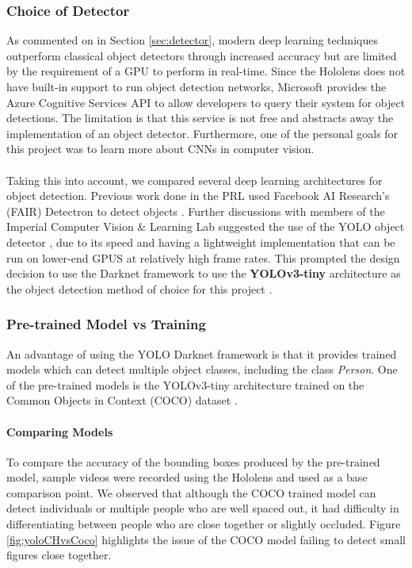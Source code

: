 \subsubsection{Choice of Detector}
As commented on in Section \ref{sec:detector}, modern deep learning techniques outperform classical object detectors through increased accuracy but are limited by the requirement of a GPU to perform in real-time. Since the Hololens does not have built-in support to run object detection networks, Microsoft provides the Azure Cognitive Services API to allow developers to query their system for object detections. The limitation is that this service is not free and abstracts away the implementation of an object detector. Furthermore, one of the personal goals for this project was to learn more about CNNs in computer vision.

\paragraph{} Taking this into account, we compared several deep learning architectures for object detection. Previous work done in the PRL used Facebook AI Research's (FAIR) Detectron to detect objects \cite{Chacon-Quesada, Detectron2018, Rena}. Further discussions with members of the Imperial Computer Vision \& Learning Lab suggested the use of the YOLO object detector \cite{Redmon}, due to its speed and having a lightweight implementation that can be run on lower-end GPUS at relatively high frame rates. This prompted the design decision to use the Darknet framework to use the \textbf{YOLOv3-tiny} architecture as the object detection method of choice for this project \cite{Redmon2018}.

\subsubsection{Pre-trained Model vs Training} \label{sec:designYOLO}
An advantage of using the YOLO Darknet framework is that it provides trained models which can detect multiple object classes, including the class \textit{Person}. One of the pre-trained models is the YOLOv3-tiny architecture trained on the Common Objects in Context (COCO) dataset \cite{Lin}.

\paragraph{Comparing Models} To compare the accuracy of the bounding boxes produced by the pre-trained model, sample videos were recorded using the Hololens and used as a base comparison point. We observed that although the COCO trained model can detect individuals or multiple people who are well spaced out, it had difficulty in differentiating between people who are close together or slightly occluded. Figure \ref{fig:yoloCHvsCoco} highlights the issue of the COCO model failing to detect small figures close together.

